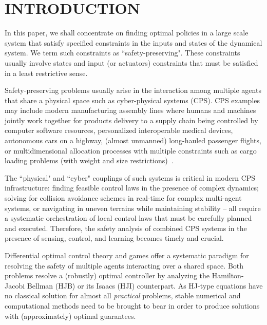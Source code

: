 
\section{INTRODUCTION}

In this paper, we shall concentrate on finding optimal policies in a large scale system that satisfy specified constraints in the inputs and states of the dynamical system. We term such constraints as ``safety-preserving". These constraints usually involve states and input (or actuators) constraints that must be satisfied in a least restrictive sense.  

Safety-preserving problems usually arise in the interaction among multiple agents that share a physical  space such as cyber-physical systems (CPS). CPS examples  may include modern manufacturing assembly lines where humans and machines jointly work together for   products delivery to a supply chain being controlled by computer software resources, personalized interoperable medical devices, autonomous cars on a highway, (almost unmanned) long-hauled passenger flights, or multidimensional allocation processes with multiple constraints such as cargo loading problems (with weight and size restrictions)~\cite[Ch. II]{AppliedDPBellman}.

The ``physical" and ``cyber" couplings of such systems is critical in modern CPS infrastructure: finding feasible control laws  in the presence of complex dynamics; solving for collision avoidance schemes in real-time  for complex multi-agent systems, or navigating in uneven terrains while maintaining stability -- all require a systematic orchestration of local control laws that must be carefully planned and executed. Therefore,  the safety analysis of combined CPS systems in the presence of sensing, control, and learning becomes timely and crucial. 

Differential optimal control theory and games offer a systematic paradigm for resolving the safety of multiple agents interacting over a shared space. Both problems resolve a (robustly) optimal controller by analyzing the Hamilton-Jacobi Bellman (HJB) or its Isaacs (HJI) counterpart.  As HJ-type equations have no classical solution for almost all \textit{practical} problems, stable numerical and computational methods need to be brought to bear in order to produce solutions with (approximately) optimal guarantees. 

